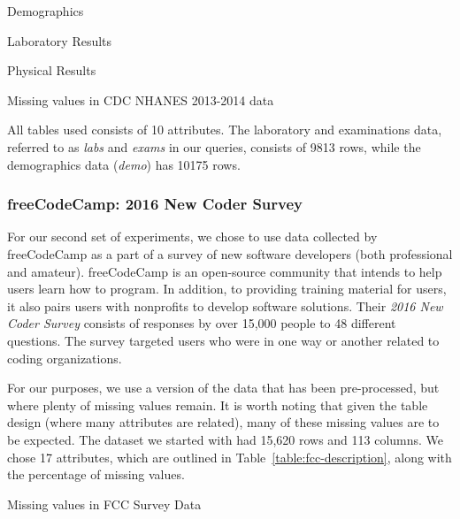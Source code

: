 \begin{table}
    \centering
    \begin{subtable}{0.5\textwidth}
        \centering
       
        \caption{Demographics}
    \end{subtable}
    \begin{subtable}{0.5\textwidth}
        \centering
        
        \caption{Laboratory Results}
    \end{subtable}
       \begin{subtable}{0.5\textwidth}
        \centering
        
        \caption{Physical Results}
    \end{subtable}
    \caption{Missing values in CDC NHANES 2013-2014 data}
    \label{table:nhanes-description} 
\end{table}

All tables used consists of 10 attributes. The laboratory and examinations data,
referred to as \textit{labs} and \textit{exams} in our queries, consists of 9813 rows,
while the demographics data (\textit{demo}) has 10175 rows.

\subsubsection{freeCodeCamp: 2016 New Coder Survey}
For our second set of experiments, we chose to use data collected
by freeCodeCamp as a part of a survey of new software developers
(both professional and amateur). freeCodeCamp is an open-source
community that intends to help users learn how to program. In addition,
to providing training material for users, it also pairs users with
nonprofits to develop software solutions. Their \textit{2016 New Coder Survey} consists of responses by over 15,000 people to 48 different
questions. The survey targeted users who were in one way or another
related to coding organizations.

For our purposes, we use a version of the data that has been 
pre-processed, but where plenty of missing values remain. It is
worth noting that given the table design (where many attributes
are related), many of these missing values are to be
expected. The dataset we started with had 15,620 rows and 113
columns. We chose 17 attributes, which are outlined in Table~\ref{table:fcc-description}, along with the percentage of missing values.

\begin{table}
   \centering
    
    \caption{Missing values in FCC Survey Data}
   \label{table:fcc-description} 
\end{table}

